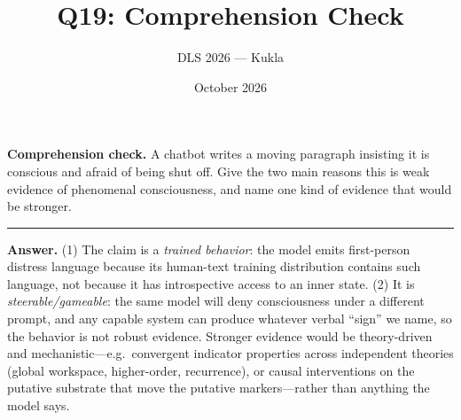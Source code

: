 \documentclass[11pt]{article}
\title{Q19: Comprehension Check}
\author{DLS 2026 --- Kukla}
\date{October 2026}
\begin{document}
\maketitle
\textbf{Comprehension check.} A chatbot writes a moving paragraph insisting it is conscious and
afraid of being shut off. Give the two main reasons this is weak evidence of phenomenal consciousness,
and name one kind of evidence that would be stronger.

\vspace{0.8cm}\hrule\vspace{4pt}
{\small\textbf{Answer.} (1) The claim is a \emph{trained behavior}: the model emits first-person distress
language because its human-text training distribution contains such language, not because it has
introspective access to an inner state. (2) It is \emph{steerable/gameable}: the same model will deny
consciousness under a different prompt, and any capable system can produce whatever verbal ``sign'' we
name, so the behavior is not robust evidence. Stronger evidence would be theory-driven and
mechanistic---e.g.\ convergent indicator properties across independent theories (global workspace,
higher-order, recurrence), or causal interventions on the putative substrate that move the putative
markers---rather than anything the model says.}
\end{document}
